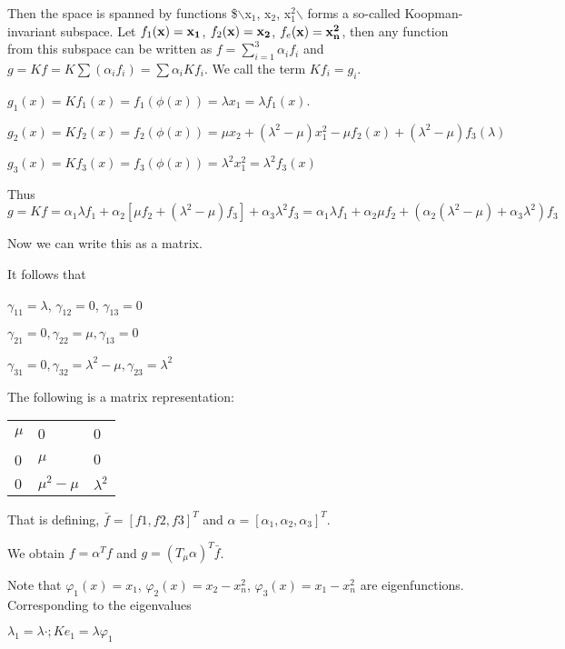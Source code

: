 \documentclass[11pt]{article}
\begin{document}
Then the space is spanned by functions \$$\backslash${x\(_{\text{1}}\), x\(_{\text{2}}\), x\(_{\text{1}}^{\text{2}}\)$\backslash$} forms a so-called
Koopman-invariant subspace. Let \(f_1(\bf{x}) = x_1\), \(f_2(\bf{x}) = x_2\),
\(f_e(\bf{x}) = x_n^2\), then any function from this subspace can be written as
\(f = \sum_{i=1}^{3} \alpha_i f_i\) and \(g=Kf = K\sum(\alpha_i f_i) = \sum
   \alpha_i Kf_i\). We call the term \(Kf_i = g_i\).

\(g_1(x) = Kf_1(x) = f_1(\phi(x)) = \lambda x_1 =\lambda f_1(x)\).

\(g_2(x) = Kf_2(x) = f_2(\phi(x)) =\mu x_2 + (\lambda^2 - \mu)x_1^2 - \mu
   f_2(x) + (\lambda^2 - \mu)f_3(\lambda)\)

\(g_3(x) = Kf_3(x) = f_3(\phi(x)) = \lambda^2 x_1^2 = \lambda^2 f_3(x)\)

Thus \(g = Kf = \alpha_1 \lambda f_1 + \alpha_2[\mu f_2 + (\lambda^2 -
   \mu)f_3] + \alpha_3 \lambda^2 f_3 = \alpha_1\lambda f_1 + \alpha_2 \mu f_2 +
   (\alpha_2(\lambda^2 - \mu) + \alpha_3 \lambda^2)f_3\)

Now we can write this as a matrix.

It follows that

\(\gamma_{11} = \lambda\), \(\gamma_{12} = 0\), \(\gamma_{13} = 0\)

\(\gamma_{21} = 0, \gamma_{22} = \mu, \gamma_{13} = 0\)

\(\gamma_{31} = 0, \gamma_{32} = \lambda^2 - \mu, \gamma_{23} = \lambda^2\)

The following is a matrix representation: 

\begin{center}
\begin{tabular}{lll}
\(\mu\) & 0 & 0\\
0 & \(\mu\) & \(0\)\\
\(0\) & \(\mu^2 - \mu\) & \(\lambda^2\)\\
\end{tabular}
\end{center}

That is defining, \(\bar{f} = [f1, f2, f3]^T\) and \(\alpha = [\alpha_1,
   \alpha_2, \alpha_3]^T\).

We obtain \(f = \alpha^T f\) and \(g=(T_\mu \alpha)^T\bar{f}\).

Note that \(\varphi_1(x) = x_1\), \(\varphi_2(x)=x_2 - x_n^2\), \(\varphi_3(x) = x_1-x_n^2\) are
eigenfunctions. Corresponding to the eigenvalues

\(\lambda_1 = \lambda \cdot; Ke_1 = \lambda \varphi_1\)
\end{document}
